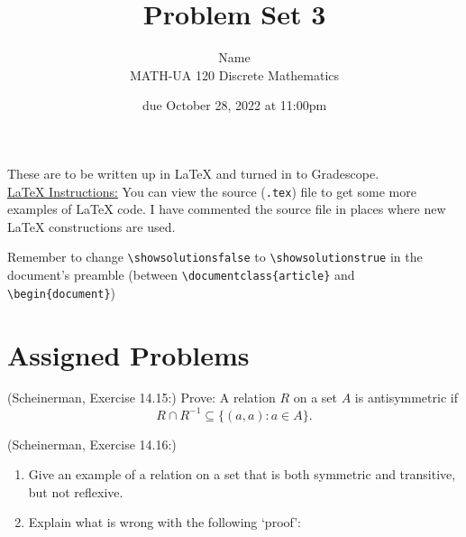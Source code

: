 \documentclass{article}
\title{Problem Set 3}
\author{%
    Name
\\  MATH-UA 120 Discrete Mathematics
}
\date{due October 28, 2022 at 11:00pm}
\newif\ifshowsolutions
\newcommand{\danger}{\marginpar[\hfill\dbend]{\dbend\hfill}}
\theoremstyle{definition}
\begin{document}
\maketitle



These are to be written up in \LaTeX{} and turned in to Gradescope.\\



\ifshowsolutions
    \SetupExSheets{solution/print=true}
\else
    \danger
 \underline{ \LaTeX{}  Instructions:}  You can view the source (\texttt{.tex}) file to get some more examples of \LaTeX{} code.  I have commented the source file in places where new \LaTeX{} constructions are used.
  
  Remember to change \verb|\showsolutionsfalse| to \verb|\showsolutionstrue|
    in the document's preamble 
    (between \verb|\documentclass{article}| and \verb|\begin{document}|)
\fi

\section*{Assigned Problems}

\begin{question}
    (Scheinerman, Exercise 14.15:)
    Prove: A relation $R$ on a set $A$ is antisymmetric if 
    \[ R \cap R^{-1} \subseteq \{ (a, a) : a \in A \}. \]
\end{question}
\begin{solution}
\end{solution}


\begin{question}
    (Scheinerman, Exercise 14.16:)
    \begin{enumerate}
        \item Give an example of a relation on a set that is both symmetric and transitive, but not reflexive.
        \item Explain what is wrong with the following `proof':
        
    \end{enumerate}
\end{question}
\begin{solution}
\end{solution}
\end{document}
